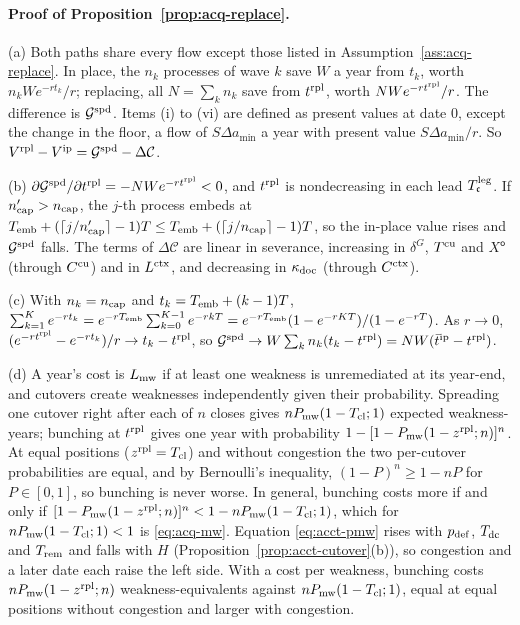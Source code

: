 \paragraph{Proof of Proposition~\ref{prop:acq-replace}.}
(a) Both paths share every flow except those listed in Assumption~\ref{ass:acq-replace}. In place, the $n_k$ processes of wave $k$ save $W$ a year from $t_k$, worth $n_kWe^{-rt_k}/r$; replacing, all $N=\sum_kn_k$ save from $t^{\rm rpl}$, worth $NWe^{-rt^{\rm rpl}}/r$. The difference is $\mathcal G^{\rm spd}$. Items (i) to (vi) are defined as present values at date 0, except the change in the floor, a flow of $S\Delta a_{\min}$ a year with present value $S\Delta a_{\min}/r$. So $V^{\rm rpl}-V^{\rm ip}=\mathcal G^{\rm spd}-\Delta\mathcal C$.

(b) $\partial\mathcal G^{\rm spd}/\partial t^{\rm rpl}=-NWe^{-rt^{\rm rpl}}<0$, and $t^{\rm rpl}$ is nondecreasing in each lead $T^{\rm leg}_{\mathfrak c}$. If $n'_{\rm cap}>n_{\rm cap}$, the $j$-th process embeds at $T_{\rm emb}+(\lceil j/n'_{\rm cap}\rceil-1)T\le T_{\rm emb}+(\lceil j/n_{\rm cap}\rceil-1)T$, so the in-place value rises and $\mathcal G^{\rm spd}$ falls. The terms of $\Delta\mathcal C$ are linear in severance, increasing in $\delta^G$, $T^{\rm cu}$ and $X^{\mathsf o}$ (through $C^{\rm cu}$) and in $L^{\rm ctx}$, and decreasing in $\kappa_{\rm doc}$ (through $C^{\rm ctx}$).

(c) With $n_k=n_{\rm cap}$ and $t_k=T_{\rm emb}+(k-1)T$, $\sum_{k=1}^Ke^{-rt_k}=e^{-rT_{\rm emb}}\sum_{k=0}^{K-1}e^{-rkT}=e^{-rT_{\rm emb}}(1-e^{-rKT})/(1-e^{-rT})$. As $r\to0$, $(e^{-rt^{\rm rpl}}-e^{-rt_k})/r\to t_k-t^{\rm rpl}$, so $\mathcal G^{\rm spd}\to W\sum_kn_k(t_k-t^{\rm rpl})=NW(\bar t^{\rm ip}-t^{\rm rpl})$.

(d) A year's cost is $L_{\rm mw}$ if at least one weakness is unremediated at its year-end, and cutovers create weaknesses independently given their probability. Spreading one cutover right after each of $n$ closes gives $nP_{\rm mw}(1-T_{\rm cl};1)$ expected weakness-years; bunching at $t^{\rm rpl}$ gives one year with probability $1-[1-P_{\rm mw}(1-z^{\rm rpl};n)]^n$. At equal positions ($z^{\rm rpl}=T_{\rm cl}$) and without congestion the two per-cutover probabilities are equal, and by Bernoulli's inequality, $(1-P)^n\ge1-nP$ for $P\in[0,1]$, so bunching is never worse. In general, bunching costs more if and only if $[1-P_{\rm mw}(1-z^{\rm rpl};n)]^n<1-nP_{\rm mw}(1-T_{\rm cl};1)$, which for $nP_{\rm mw}(1-T_{\rm cl};1)<1$ is \eqref{eq:acq-mw}. Equation \eqref{eq:acct-pmw} rises with $p_{\rm def}$, $T_{\rm dc}$ and $T_{\rm rem}$ and falls with $H$ (Proposition~\ref{prop:acct-cutover}(b)), so congestion and a later date each raise the left side. With a cost per weakness, bunching costs $nP_{\rm mw}(1-z^{\rm rpl};n)$ weakness-equivalents against $nP_{\rm mw}(1-T_{\rm cl};1)$, equal at equal positions without congestion and larger with congestion.

